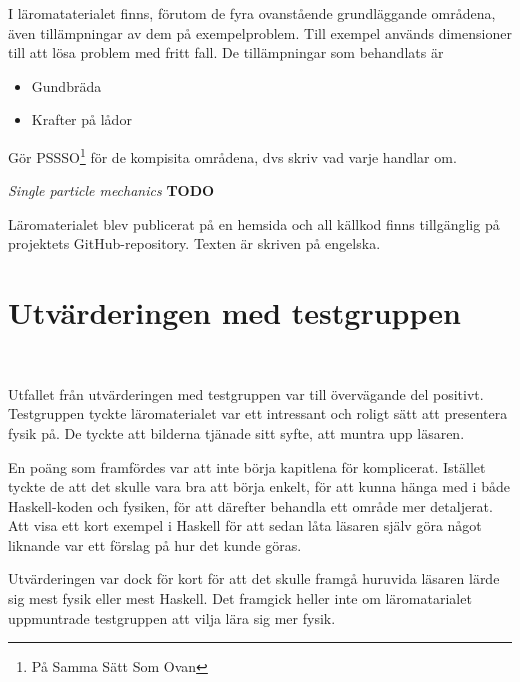 \begin{draft}
I läromataterialet finns, förutom de fyra ovanstående grundläggande områdena,
även tillämpningar av dem på exempelproblem. Till exempel används dimensioner
till att lösa problem med fritt fall. De tillämpningar som behandlats är

\begin{itemize}
  \item Gundbräda
  \item Krafter på lådor
\end{itemize}

Gör PSSSO\footnote{På Samma Sätt Som Ovan} för de kompisita områdena, dvs skriv
vad varje handlar om.

\textit{Single particle mechanics} \textbf{TODO}

Läromaterialet blev publicerat på en hemsida\cite{LYAP} och all källkod finns
tillgänglig på projektets GitHub-repository.\cite{LYAP_repo} Texten är skriven
på engelska.

%
%
%

\section{Utvärderingen med testgruppen}~\label{sec:res_test}

Utfallet från utvärderingen med testgruppen var till övervägande del positivt.
Testgruppen tyckte läromaterialet var ett intressant och roligt sätt att
presentera fysik på. De tyckte att bilderna tjänade sitt syfte, att muntra upp
läsaren. 

En poäng som framfördes var att inte börja kapitlena för komplicerat. Istället
tyckte de att det skulle vara bra att börja enkelt, för att kunna hänga med i
både Haskell-koden och fysiken, för att därefter behandla ett område mer
detaljerat. Att visa ett kort exempel i Haskell för att sedan låta läsaren själv
göra något liknande var ett förslag på hur det kunde göras.

Utvärderingen var dock för kort för att det skulle framgå huruvida läsaren lärde
sig mest fysik eller mest Haskell. Det framgick heller inte om läromatarialet
uppmuntrade testgruppen att vilja lära sig mer fysik.


\end{draft}
